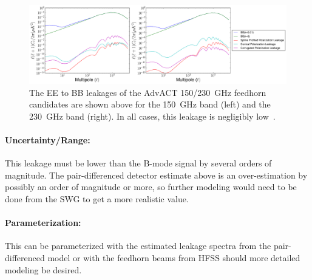 \begin{figure}[h!]
\centering
\includegraphics[width=\textwidth]{figures/HF_EB_leakage.pdf}
\caption{The EE to BB leakages of the AdvACT 150/230~GHz feedhorn candidates are shown above for the 150~GHz band (left) and the 230~GHz band (right). In all cases, this leakage is negligibly low~\cite{Simon_Thesis_2016}.}
\label{fig:HF_EB_leakage}
\end{figure}


\paragraph{Uncertainty/Range:}
This leakage must be lower than the B-mode signal by several orders of magnitude. The pair-differenced detector estimate above is an over-estimation by possibly an order of magnitude or more, so further modeling would need to be done from the SWG to get a more realistic value.

\paragraph{Parameterization:}
This can be parameterized with the estimated leakage spectra from the pair-differenced model or with the feedhorn beams from HFSS should more detailed modeling be desired.

